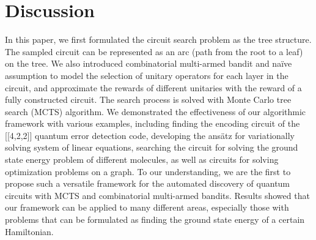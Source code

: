 \documentclass[a4paper,onecolumn,11pt]{quantumarticle}
\begin{document}
\section{Discussion}\label{discussion}
In this paper, we first formulated the circuit search problem as the tree structure. The sampled circuit can be represented as an arc (path from the root to a leaf) on the tree. We also introduced combinatorial multi-armed bandit and na\"ive assumption to model the selection of unitary operators for each layer in the circuit, and approximate the rewards of different unitaries with the reward of a fully constructed circuit. The search process is solved with Monte Carlo tree search (MCTS) algorithm. We demonstrated the effectiveness of our algorithmic framework with various examples, including finding the encoding circuit of the [[4,2,2]] quantum error detection code, developing the ans\"atz for variationally solving system of linear equations, searching the circuit for solving the ground state energy problem of different molecules, as well as circuits for solving optimization problems on a graph. To our understanding, we are the first to propose such a versatile framework for the automated discovery of quantum circuits with MCTS and combinatorial multi-armed bandits. Results showed that our framework can be applied to many different areas, especially those with problems that can be formulated as finding the ground state energy of a certain Hamiltonian.
\end{document}
